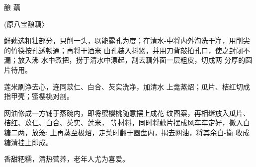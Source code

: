 \begin{recipe}{酿	藕}

(原八宝酿藕〉

\ingredients



\cooking

\step 	鲜藕选粗壮部分，只削一头，以能露孔为度；在清水-中将内外淘洗干净，用削尖的竹筷按孔透畅通；再将干酒米 由孔装入抖紧，并用刀背敲拍孔口，使之封闭不漏；放入沸 水中煮把，捞于清水中漂起，刮去藕外面一层粗皮，切成两 分厚的圆片待用。

\step 	莲米刷浄去心，连同苡仁、白合、芡实洗净，加清水 上龛蒸炤；瓜片、桔红切成指甲壳；蜜樱桃对剖。

\step 	网油修成一方铺于蒸碗内，即将蜜樱桃随意摆上成花 纹图案，再相继放入瓜片、桔红、苡仁、白合、芡实、莲米， 等材料，同时将藕片摆成风车车定好，撒入白糖二两，放笼: 上再蒸至极炤，走菜时翻于圆盘内，揭去网油，将其余白-衞 收成糖清挂上即成。

\notes

香甜粑糯，清热营养，老年人尤为喜爱。

\end{recipe}

